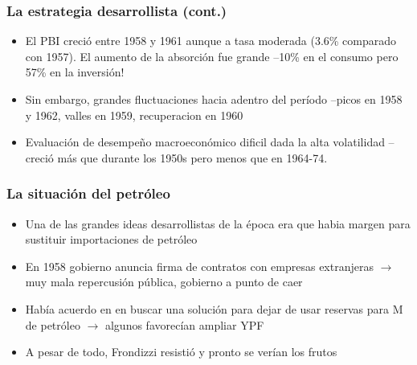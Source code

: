 \documentclass[14pt,aspectratio=169]{beamer}
\begin{document}
 \begin{frame}\frametitle{La estrategia desarrollista (cont.)}
                 \begin{itemize}\itemsep 5pt \medskip
                 \item El PBI creció entre 1958 y 1961 aunque a tasa
                   moderada (3.6\% comparado con 1957). El aumento de
                   la absorción fue grande --10\% en el consumo pero
                   57\% en la inversión!
                   \item Sin embargo, grandes fluctuaciones hacia
                     adentro del período --picos en 1958 y 1962,
                     valles en 1959, recuperacion en 1960
                     \item Evaluación de desempeño macroeconómico
                       dificil dada la alta volatilidad --creció más
                       que durante los 1950s pero menos que en
                       1964-74. 
                   \end{itemize}
               \end{frame}


 \begin{frame}\frametitle{La situación del petróleo}
                 \begin{itemize}\itemsep 5pt \medskip
                 \item Una de las grandes ideas desarrollistas de la
                   época era que habia margen para sustituir
                   importaciones de petróleo
                   \item En 1958 gobierno anuncia firma de contratos
                     con empresas extranjeras $\longrightarrow$ muy
                     mala repercusión pública, gobierno a punto de
                     caer
                     \item Había acuerdo en en buscar una solución
                       para dejar de usar reservas para M de petróleo
                       $\longrightarrow$ algunos favorecían ampliar YPF
                     \item A pesar de todo, Frondizzi resistió y
                       pronto se verían los frutos
                   \end{itemize}
               \end{frame}
\end{document}
